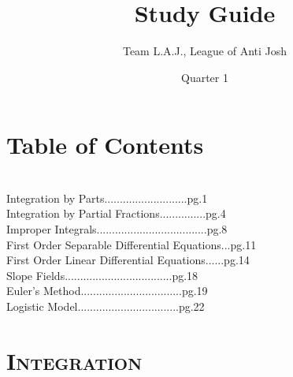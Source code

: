 \documentclass[a4paper,openright, 10pt]{article}
\title{Study Guide}
\author{Team L.A.J., League of Anti Josh}
\date{Quarter 1}
\newcommand{\ssection}[1]{%
\section[#1]{\centering\normalfont\scshape #1}}
\begin{document}
\maketitle
\section*{Table of Contents}\\
Integration by Parts...........................pg.1\\
Integration by Partial Fractions...............pg.4\\
Improper Integrals....................................pg.8\\
First Order Separable Differential Equations...pg.11\\
First Order Linear Differential Equations......pg.14\\
Slope Fields...................................pg.18\\
Euler's Method.................................pg.19\\
Logistic Model.................................pg.22\\
\ssection{Integration}
\end{document}
